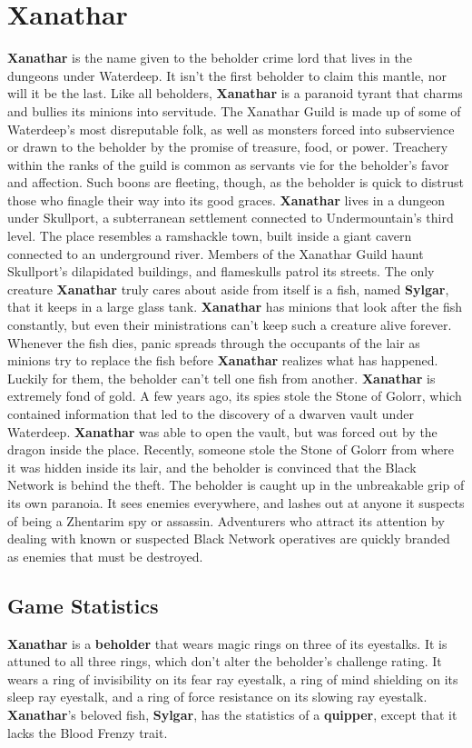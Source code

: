\documentclass[10pt,a4paper,twoside,twocolumn,openany,nodeprecatedcode]{dndbook}
\begin{document}
\section{Xanathar}
\textbf{Xanathar} is the name given to the beholder crime lord that lives in the dungeons under Waterdeep. It isn't the first beholder to claim this mantle, nor will it be the last.
Like all beholders, \textbf{Xanathar} is a paranoid tyrant that charms and bullies its minions into servitude. The Xanathar Guild is made up of some of Waterdeep's most disreputable folk, as well as monsters forced into subservience or drawn to the beholder by the promise of treasure, food, or power. Treachery within the ranks of the guild is common as servants vie for the beholder's favor and affection. Such boons are fleeting, though, as the beholder is quick to distrust those who finagle their way into its good graces.
\textbf{Xanathar} lives in a dungeon under Skullport, a subterranean settlement connected to Undermountain's third level. The place resembles a ramshackle town, built inside a giant cavern connected to an underground river. Members of the Xanathar Guild haunt Skullport's dilapidated buildings, and flameskulls patrol its streets.
The only creature \textbf{Xanathar} truly cares about aside from itself is a fish, named \textbf{Sylgar}, that it keeps in a large glass tank. \textbf{Xanathar} has minions that look after the fish constantly, but even their ministrations can't keep such a creature alive forever. Whenever the fish dies, panic spreads through the occupants of the lair as minions try to replace the fish before \textbf{Xanathar} realizes what has happened. Luckily for them, the beholder can't tell one fish from another.
\textbf{Xanathar} is extremely fond of gold. A few years ago, its spies stole the Stone of Golorr, which contained information that led to the discovery of a dwarven vault under Waterdeep. \textbf{Xanathar} was able to open the vault, but was forced out by the dragon inside the place. Recently, someone stole the Stone of Golorr from where it was hidden inside its lair, and the beholder is convinced that the Black Network is behind the theft.
The beholder is caught up in the unbreakable grip of its own paranoia. It sees enemies everywhere, and lashes out at anyone it suspects of being a Zhentarim spy or assassin. Adventurers who attract its attention by dealing with known or suspected Black Network operatives are quickly branded as enemies that must be destroyed.
\subsection{Game Statistics}
\textbf{Xanathar} is a \textbf{beholder} that wears magic rings on three of its eyestalks. It is attuned to all three rings, which don't alter the beholder's challenge rating. It wears a ring of invisibility on its fear ray eyestalk, a ring of mind shielding on its sleep ray eyestalk, and a ring of force resistance on its slowing ray eyestalk.
\textbf{Xanathar}'s beloved fish, \textbf{Sylgar}, has the statistics of a \textbf{quipper}, except that it lacks the Blood Frenzy trait.
\end{document}
